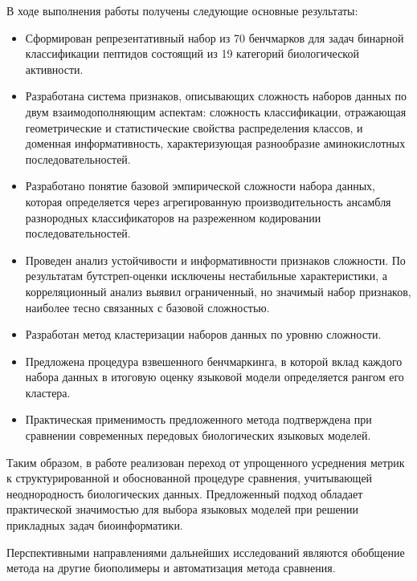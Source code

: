 \documentclass[specification,annotation,times]{itmo-student-thesis}
\begin{document}
В ходе выполнения работы получены следующие основные результаты:
\begin{itemize}
    \item Сформирован репрезентативный набор из 70 бенчмарков для задач бинарной классификации пептидов состоящий из 19 категорий биологической активности.
    \item Разработана система признаков, описывающих сложность наборов данных по двум взаимодополняющим аспектам: сложность классификации, отражающая геометрические и статистические свойства распределения классов, и доменная информативность, характеризующая разнообразие аминокислотных последовательностей. 
    \item Разработано понятие базовой эмпирической сложности набора данных, которая определяется через агрегированную производительность ансамбля разнородных классификаторов на разреженном кодировании последовательностей. 
    \item Проведен анализ устойчивости и информативности признаков сложности. По результатам бутстреп-оценки исключены нестабильные характеристики, а корреляционный анализ выявил ограниченный, но значимый набор признаков, наиболее тесно связанных с базовой сложностью.
    \item Разработан метод кластеризации наборов данных по уровню сложности. 
    \item Предложена процедура взвешенного бенчмаркинга, в которой вклад каждого набора данных в итоговую оценку языковой модели определяется рангом его кластера. 
    \item Практическая применимость предложенного метода подтверждена при сравнении современных передовых биологических языковых моделей.
\end{itemize}

Таким образом, в работе реализован переход от упрощенного усреднения метрик к структурированной и обоснованной процедуре сравнения, 
учитывающей неоднородность биологических данных. 
Предложенный подход обладает практической значимостью для выбора языковых моделей при решении прикладных задач биоинформатики.

Перспективными направлениями дальнейших исследований являются обобщение метода на другие биополимеры и автоматизация метода сравнения.

\printmainbibliography

\appendix
\end{document}
